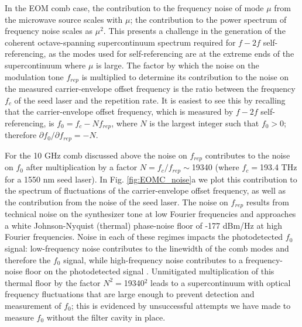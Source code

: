 In the EOM comb case, the contribution to the frequency noise of mode $\mu$ from the microwave source scales with $\mu$; the contribution to the power spectrum of frequency noise scales as $\mu^2$. This presents a challenge in the generation of the coherent octave-spanning supercontinuum spectrum required for $f-2f$ self-referencing, as the modes used for self-referencing are at the extreme ends of the supercontinuum where $\mu$ is large. The factor by which the noise on the modulation tone $f_{rep}$ is multiplied to determine its contribution to the noise on the measured carrier-envelope offset frequency is the ratio between the frequency $f_c$ of the seed laser and the repetition rate. It is easiest to see this by recalling that the carrier-envelope offset frequency, which is measured by $f-2f$ self-referencing, is $f_0=f_c-Nf_{rep}$, where $N$ is the largest integer such that $f_0>0$; therefore $\partial f_0/\partial f_{rep}=-N$. 

For the 10 GHz comb discussed above the noise on $f_{rep}$ contributes to the noise on $f_0$ after multiplication by a factor $N=f_c/f_{rep}\sim$19340 (where $f_c=$193.4 THz for a 1550 nm seed laser). In Fig. \ref{fig:EOMC_noise}a we plot this contribution to the spectrum of fluctuations of the carrier-envelope offset frequency, as well as the contribution from the noise of the seed laser. The noise on $f_{rep}$ results from technical noise on the synthesizer tone at low Fourier frequencies and approaches a white Johnson-Nyquist (thermal) phase-noise floor of -177 dBm/Hz at high Fourier frequencies. Noise in each of these regimes impacts the photodetected $f_0$ signal: low-frequency noise contributes to the linewidth of the comb modes and therefore the $f_0$ signal, while high-frequency noise contributes to a frequency-noise floor on the photodetected signal \cite{DiDomenico2010}. Unmitigated multiplication of this thermal floor by the factor $N^2=$19340$^2$ leads to a supercontinuum with optical frequency fluctuations that are large enough to prevent detection and measurement of $f_0$; this is evidenced by unsuccessful attempts we have made to measure $f_0$ without the filter cavity in place.

